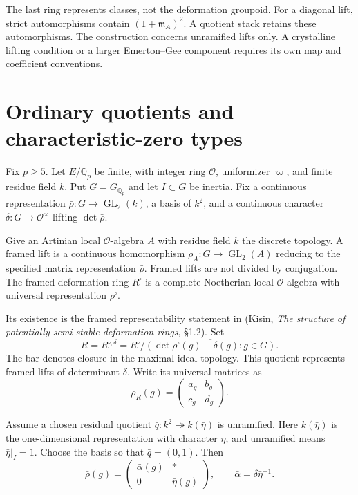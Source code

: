 The last ring represents classes, not the deformation groupoid.
For a diagonal lift, strict automorphisms contain
$(1+\mathfrak m_A)^2$. A quotient stack retains these automorphisms.
The construction concerns unramified lifts only. A crystalline lifting
condition or a larger Emerton--Gee component requires its own map and
coefficient conventions.


\section{Ordinary quotients and characteristic-zero types}
\label{v4-arith:ic:ordinary}

Fix $p\ge5$. Let $E/\mathbb Q_p$ be finite, with integer ring
$\mathcal O$, uniformizer $\varpi$, and finite residue field $k$.
Put $G=G_{\mathbb Q_p}$ and let $I\subset G$ be inertia.
Fix a continuous representation
$\bar\rho:G\to\operatorname{GL}_2(k)$, a basis of $k^2$, and a
continuous character $\delta:G\to\mathcal O^\times$ lifting
$\det\bar\rho$.

Give an Artinian local $\mathcal O$-algebra $A$ with residue field $k$
the discrete topology. A framed lift is a continuous homomorphism
$\rho_A:G\to\operatorname{GL}_2(A)$ reducing to the specified matrix
representation $\bar\rho$. Framed lifts are not divided by conjugation.
The framed deformation ring $R^\square$ is a complete Noetherian
local $\mathcal O$-algebra with universal representation
$\rho^\square$.

Its existence is the framed representability statement
in (Kisin, \emph{The structure of potentially semi-stable deformation rings}, \S1.2).
Set
\[
 R=R^{\square,\delta}
 =R^\square/\overline{(\det\rho^\square(g)-\delta(g):g\in G)}.
\]
The bar denotes closure in the maximal-ideal topology.
This quotient represents framed lifts of determinant $\delta$.
Write its universal matrices as
\[
 \rho_R(g)=\begin{pmatrix}a_g&b_g\\c_g&d_g\end{pmatrix}.
\]

Assume a chosen residual quotient
$\bar q:k^2\twoheadrightarrow k(\bar\eta)$ is unramified.
Here $k(\bar\eta)$ is the one-dimensional representation with
character $\bar\eta$, and unramified means $\bar\eta|_I=1$.
Choose the basis so that $\bar q=(0,1)$.
Then
\[
 \bar\rho(g)=
 \begin{pmatrix}\bar\alpha(g)&*\\0&\bar\eta(g)\end{pmatrix},
 \qquad \bar\alpha=\bar\delta\bar\eta^{-1}.
\]

